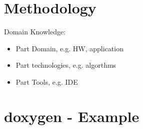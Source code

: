 \documentclass[12pt,a4paper]{scrbook}
\begin{document}
\chapter{Methodology}

Domain Knowledge:

\begin{itemize}
    \item Part Domain, e.g. HW, application
    \item Part technologies, e.g. algorthms
    \item Part Tools, e.g. IDE
\end{itemize}


\chapter{doxygen - Example}

\cleardoublepage
{}
\printbibliography


\cleardoublepage

\printindex
\end{document}
